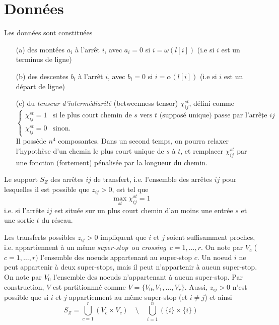 \documentclass{article}
\theoremstyle{plain}
\begin{document}
\section{Données}
Les données sont constituées 
\begin{itemize}
  \item[(a)] des montées $a_i$ à l'arrêt $i$, avec $a_i=0$ si $i=\omega(l[i])$ (i.e si $i$ est un terminus de ligne) 
  \item[(b)]  des descentes $b_i$ à l'arrêt $i$, avec $b_i=0$ si  $i=\alpha(l[i])$ (i.e si $i$ est un départ de ligne) 
  \item[(c)]  du {\em tenseur d'intermédiarité} (betweenness tensor) $\chi_{ij}^{st}$, défini comme
\begin{equation}
\label{ }
\begin{cases}
 \chi_{ij}^{st}=1     & \text{si  le plus court chemin de $s$ vers $t$ (supposé unique) passe par l'arrête $ij$}, \\
 \chi_{ij}^{st}=0         & \text{sinon}.
\end{cases}
\end{equation}
Il possède $n^4$ composantes. Dans un second temps, on pourra relaxer l'hypothèse d'un chemin le plus court unique de $s$ à $t$, et remplacer $\chi_{ij}^{st}$ par une fonction (fortement) pénalisée par la longueur du chemin.
\end{itemize}
Le support $S_Z$ des arrêtes $ij$ de transfert, i.e.  l'ensemble des arrêtes $ij$ pour lesquelles il est possible que $z_{ij}>0$, est tel que
\begin{displaymath}
\max_{st} \chi_{ij}^{st}=1 
\end{displaymath}
i.e. si l'arrête $ij$ est située sur un plus court chemin d'au moins une entrée $s$ et une sortie $t$ du réseau. 

Les transferts possibles $z_{ij}>0$  impliquent que $i$ et $j$ soient suffisamment proches, i.e. appartiennent à un même {\em super-stop} ou {\em crossing} $c=1,\ldots,r$. On note par $V_c$ ($c=1,\ldots, r)$ l'ensemble des noeuds appartenant au super-stop $c$. Un noeud $i$ ne peut appartenir à deux super-stops, mais il peut n'appartenir à aucun super-stop. On note par $V_0$ l'ensemble des noeuds n'appartenant à aucun super-stop. Par construction, $V$ est partitionnné comme
 $V=\{V_0,V_1,\ldots, V_r\}$. Aussi, $z_{ij}>0$ n'est possible que si $i$ et $j$ appartiennent au même super-stop (et $i\neq j$)  et ainsi 
 \begin{displaymath}
S_Z=\bigcup_{c=1}^r (V_c\times V_c)\quad \setminus\quad  \bigcup_{i=1}^n (\{i\}\times \{i\})
\end{displaymath}
\end{document}
